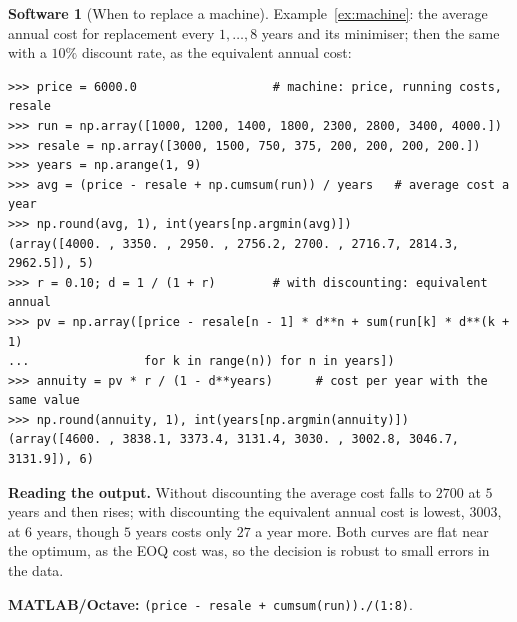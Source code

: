 \documentclass[11pt,a4paper]{article}
\numberwithin{equation}{section}
\theoremstyle{definition}
\newtheorem{software}[thm]{Software}
\begin{document}
\begin{software}[When to replace a machine]
\label{sw:replace}
Example~\ref{ex:machine}: the average annual cost for replacement every $1, \ldots, 8$ years and its minimiser; then the same with a $10\%$ discount rate, as the equivalent annual cost:
{\small\begin{verbatim}
>>> price = 6000.0                   # machine: price, running costs, resale
>>> run = np.array([1000, 1200, 1400, 1800, 2300, 2800, 3400, 4000.])
>>> resale = np.array([3000, 1500, 750, 375, 200, 200, 200, 200.])
>>> years = np.arange(1, 9)
>>> avg = (price - resale + np.cumsum(run)) / years   # average cost a year
>>> np.round(avg, 1), int(years[np.argmin(avg)])
(array([4000. , 3350. , 2950. , 2756.2, 2700. , 2716.7, 2814.3, 2962.5]), 5)
>>> r = 0.10; d = 1 / (1 + r)        # with discounting: equivalent annual
>>> pv = np.array([price - resale[n - 1] * d**n + sum(run[k] * d**(k + 1)
...                for k in range(n)) for n in years])
>>> annuity = pv * r / (1 - d**years)      # cost per year with the same value
>>> np.round(annuity, 1), int(years[np.argmin(annuity)])
(array([4600. , 3838.1, 3373.4, 3131.4, 3030. , 3002.8, 3046.7, 3131.9]), 6)
\end{verbatim}}
\textbf{Reading the output.} Without discounting the average cost falls to $2700$ at $5$ years and then rises; with discounting the equivalent annual cost is lowest, $3003$, at $6$ years, though $5$ years costs only $27$ a year more. Both curves are flat near the optimum, as the EOQ cost was, so the decision is robust to small errors in the
data.

\textbf{MATLAB/Octave:} \texttt{(price - resale + cumsum(run))./(1:8)}.
\end{software}
\end{document}
